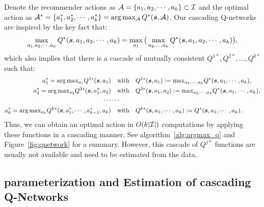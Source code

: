 \documentclass{article} %
\begin{document}
Denote the recommender actions as {\small${\mathcal{A}}=\{a_1, a_2,\cdots, a_k\}\subset {\mathcal{I}} $} and the optimal action as {\small${\mathcal{A}}^* =\{a_1^*, a_2^*, \cdots, a_k^*\} =\arg\max_{{\mathcal{A}}} Q^*(
{\bm{s}}, {\mathcal{A}})$}. Our cascading Q-networks are inspired by the key fact that:
{\small \begin{equation}\label{eq:max_decomp}
\max_{a_1,a_2,\cdots,a_k}Q^*({\bm{s}},a_1,a_2,\cdots,a_k) = \max_{a_1}\big( \max_{a_2,\ldots,a_k}Q^*({\bm{s}},a_1,a_2,\cdots,a_k) \big),
\end{equation}}
which also implies that there is a cascade of mutually consistent {\small $Q^{1*},Q^{2*},\ldots,Q^{k*}$} such that: 
{\small \begin{align*}
    a_1^* =\arg {\textstyle\max_{a_1}}Q^{1*}({\bm{s}}, a_1) & \quad\text{with}\quad\displaystyle Q^{1*}({\bm{s}}, a_1):={\textstyle\max_{a_2,\cdots,a_k}}Q^*({\bm{s}},a_1,\cdots, a_k),  \\
      a_2^* =\arg {\textstyle\max_{a_2}}Q^{2*}({\bm{s}}, a_1^*, a_2) & \quad\text{with}\quad \displaystyle Q^{2*}({\bm{s}}, a_1, a_2):={\textstyle\max_{a_3,\cdots,a_k}}Q^*({\bm{s}},a_1,\cdots, a_k), \\
      \cdots & \cdots \nonumber\\
      a_k^* = \arg {\textstyle\max_{a_k}}Q^{k*}({\bm{s}}, a_1^*,\cdots,a_{k-1}^*, a_k) & \quad\text{with}\quad Q^{k*}({\bm{s}}, a_1, \cdots,a_k):=Q^*({\bm{s}},a_1,\cdots, a_k).  
\end{align*}}
Thus, we can obtain an optimal action in $O${\small$(k|{\mathcal{I}}|)$} computations by applying these functions in a cascading manner. See algorithm~\ref{alg:argmax_q} and Figure~\ref{fig:qnetwork} for a summary. However, this cascade of $Q^{j*}$ functions are usually not available and need to be estimated from the data. 
\vspace{-3mm}
\subsection{parameterization and Estimation of cascading Q-Networks} 
\vspace{-3mm}
\end{document}

